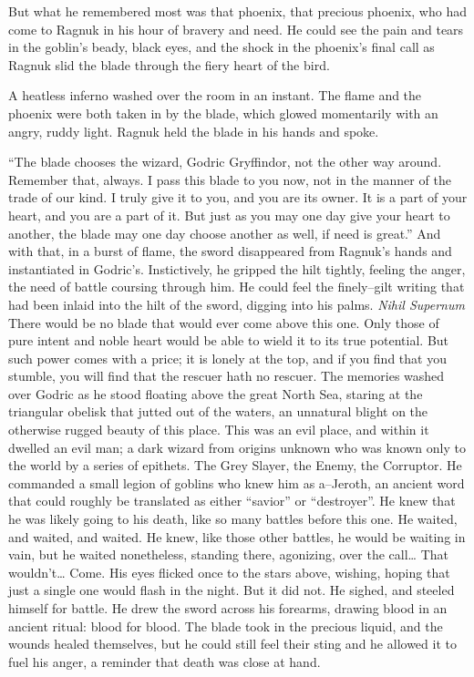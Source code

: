 But what he remembered most was that phoenix, that precious phoenix, who had come to Ragnuk in his hour of bravery and need. He could see the pain and tears in the goblin’s beady, black eyes, and the shock in the phoenix’s final call as Ragnuk slid the blade through the fiery heart of the bird.

A heatless inferno washed over the room in an instant. The flame and the phoenix were both taken in by the blade, which glowed momentarily with an angry, ruddy light. Ragnuk held the blade in his hands and spoke.

“The blade chooses the wizard, Godric Gryffindor, not the other way around. Remember that, always. I pass this blade to you now, not in the manner of the trade of our kind. I truly give it to you, and you are its owner. It is a part of your heart, and you are a part of it. But just as you may one day give your heart to another, the blade may one day choose another as well, if need is great.”
\SmallVSpace
And with that, in a burst of flame, the sword disappeared from Ragnuk’s hands and instantiated in Godric’s. Instictively, he gripped the hilt tightly, feeling the anger, the need of battle coursing through him. He could feel the finely\mbox{--}gilt writing that had been inlaid into the hilt of the sword, digging into his palms.
\SomeVSpace
\emph{Nihil Supernum}
\SomeVSpace
There would be no blade that would ever come above this one. Only those of pure intent and noble heart would be able to wield it to its true potential. But such power comes with a price; it is lonely at the top, and if you find that you stumble, you will find that the rescuer hath no rescuer.
\SomeVSpace
The memories washed over Godric as he stood floating above the great North Sea, staring at the triangular obelisk that jutted out of the waters, an unnatural blight on the otherwise rugged beauty of this place. This was an evil place, and within it dwelled an evil man; a dark wizard from origins unknown who was known only to the world by a series of epithets. The Grey Slayer, the Enemy, the Corruptor. He commanded a small legion of goblins who knew him as a\mbox{--}Jeroth, an ancient word that could roughly be translated as either “savior” or “destroyer”.
\SmallVSpace
He knew that he was likely going to his death, like so many battles before this one. He waited, and waited, and waited. He knew, like those other battles, he would be waiting in vain, but he waited nonetheless, standing there, agonizing, over the call…
\SmallVSpace
That wouldn’t…
\SmallVSpace
Come.
\SmallVSpace
His eyes flicked once to the stars above, wishing, hoping that just a single one would flash in the night. But it did not. He sighed, and steeled himself for battle. He drew the sword across his forearms, drawing blood in an ancient ritual: blood for blood. The blade took in the precious liquid, and the wounds healed themselves, but he could still feel their sting and he allowed it to fuel his anger, a reminder that death was close at hand.
